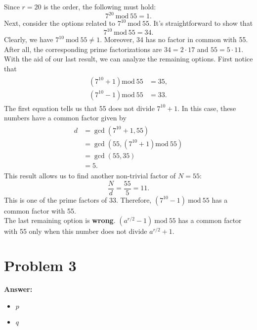 \documentclass[11pt]{article}
\newcommand{\Mod}{\mathrm{mod}\:}
\begin{document}
Since \(r=20\) is the order, the following must hold:
\begin{equation}
7^{20}\:\Mod 55=1.
\end{equation}
Next, consider the options related to \(7^{10}\:\Mod 55\). It's
straightforward to show that
\begin{equation}
7^{10}\:\Mod 55=34.
\end{equation}
Clearly, we have \(7^{10}\:\Mod 55\neq 1\). Moreover, 34 has no factor in
common with 55. After all, the corresponding prime factorizations are
\(34=2\cdot 17\) and \(55=5\cdot 11\).\\
With the aid of our last result, we can analyze the remaining options. First
notice that
\begin{align}
  \begin{split}
    \left(7^{10}+1\right)\Mod 55&=35,\\
    \left(7^{10}-1\right)\Mod 55&=33.
  \end{split}
\end{align}
The first equation tells us that 55 does not divide \(7^{10}+1\). In this
case, these numbers have a common factor given by
\begin{align}
  \begin{split}
    d&=\gcd\left(7^{10}+1,55\right)\\
    &=\gcd\left(55,\left(7^{10}+1\right)\Mod 55\right)\\
    &=\gcd(55,35)\\
    &=5.
  \end{split}
\end{align}
This result allows us to find another non-trivial factor of \(N=55\):
\begin{equation}
\frac{N}{d}=\frac{55}{5}=11.
\end{equation}
This is one of the prime factors of 33. Therefore, \((7^{10}-1)\:\Mod 55\) has a
common factor with 55.\\
The last remaining option is \textbf{wrong}. \((a^{r/2}-1)\:\Mod 55\) has a common
factor with 55 only when this number does not divide \(a^{r/2}+1\).
\section*{Problem 3}
\label{sec:orgdc2146a}

\textbf{Answer:}
\begin{itemize}
\item \(p\)
\item \(q\)\\
\end{itemize}
\end{document}
